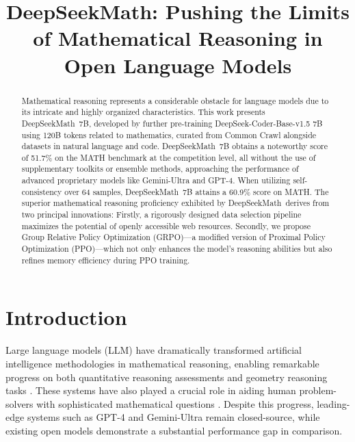 \title{DeepSeekMath: Pushing the Limits of Mathematical Reasoning in Open Language Models}

\begin{abstract}
Mathematical reasoning represents a considerable obstacle for language models due to its intricate and highly organized characteristics. This work presents DeepSeekMath~7B, developed by further pre-training DeepSeek-Coder-Base-v1.5 7B using 120B tokens related to mathematics, curated from Common Crawl alongside datasets in natural language and code. DeepSeekMath~7B obtains a noteworthy score of 51.7\% on the MATH benchmark at the competition level, all without the use of supplementary toolkits or ensemble methods, approaching the performance of advanced proprietary models like Gemini-Ultra and GPT-4. When utilizing self-consistency over 64 samples, DeepSeekMath~7B attains a 60.9\% score on MATH. The superior mathematical reasoning proficiency exhibited by DeepSeekMath~derives from two principal innovations: Firstly, a rigorously designed data selection pipeline maximizes the potential of openly accessible web resources. Secondly, we propose Group Relative Policy Optimization (GRPO)—a modified version of Proximal Policy Optimization (PPO)—which not only enhances the model’s reasoning abilities but also refines memory efficiency during PPO training.
\end{abstract}

\section{Introduction}

Large language models (LLM) have dramatically transformed artificial intelligence methodologies in mathematical reasoning, enabling remarkable progress on both quantitative reasoning assessments \citep{MATH} and geometry reasoning tasks \citep{trinh2024solving}. These systems have also played a crucial role in aiding human problem-solvers with sophisticated mathematical questions \citep{tao}. Despite this progress, leading-edge systems such as GPT-4 \citep{gpt4} and Gemini-Ultra \citep{gemini} remain closed-source, while existing open models demonstrate a substantial performance gap in comparison.

